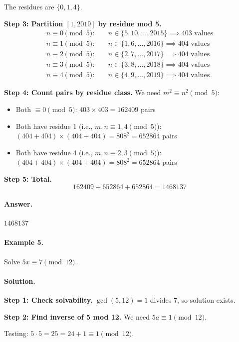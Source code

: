 \documentclass[12pt]{extarticle}
\begin{document}
The residues are $\{0, 1, 4\}$.

\textbf{Step 3: Partition $[1, 2019]$ by residue mod 5.}
\begin{align*}
n \equiv 0 \pmod{5}: &\quad n \in \{5, 10, \ldots, 2015\} \implies 403 \text{ values}\\
n \equiv 1 \pmod{5}: &\quad n \in \{1, 6, \ldots, 2016\} \implies 404 \text{ values}\\
n \equiv 2 \pmod{5}: &\quad n \in \{2, 7, \ldots, 2017\} \implies 404 \text{ values}\\
n \equiv 3 \pmod{5}: &\quad n \in \{3, 8, \ldots, 2018\} \implies 404 \text{ values}\\
n \equiv 4 \pmod{5}: &\quad n \in \{4, 9, \ldots, 2019\} \implies 404 \text{ values}
\end{align*}

\textbf{Step 4: Count pairs by residue class.} We need $m^2 \equiv n^2 \pmod{5}$:
\begin{itemize}
    \item Both $\equiv 0 \pmod{5}$: $403 \times 403 = 162409$ pairs
    \item Both have residue 1 (i.e., $m, n \equiv 1, 4 \pmod{5}$): $(404+404) \times (404+404) = 808^2 = 652864$ pairs
    \item Both have residue 4 (i.e., $m, n \equiv 2, 3 \pmod{5}$): $(404+404) \times (404+404) = 808^2 = 652864$ pairs
\end{itemize}

\textbf{Step 5: Total.}
\[
162409 + 652864 + 652864 = 1468137
\]

\paragraph{Answer.} $\boxed{1468137}$

\paragraph{Example 5.} Solve $5x \equiv 7 \pmod{12}$.

\paragraph{Solution.}
\textbf{Step 1: Check solvability.} $\gcd(5,12) = 1$ divides 7, so solution exists.

\textbf{Step 2: Find inverse of 5 mod 12.} We need $5a \equiv 1 \pmod{12}$.

Testing: $5 \cdot 5 = 25 = 24 + 1 \equiv 1 \pmod{12}$.
\end{document}

